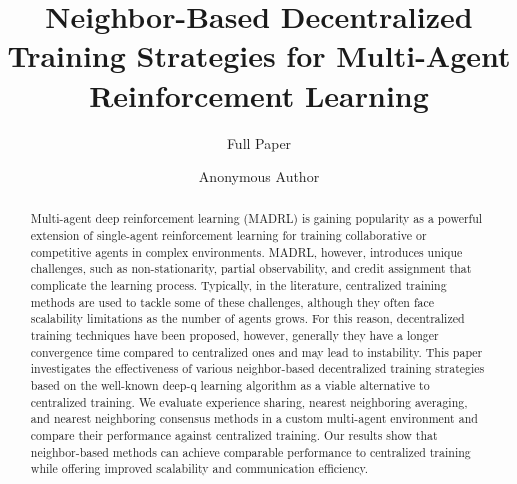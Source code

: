 \documentclass[sigconf]{acmart}
\begin{document}
\title{Neighbor-Based Decentralized Training Strategies for Multi-Agent Reinforcement Learning}
\subtitle{Full Paper}
  
\renewcommand{\shorttitle}{SIG Proceedings Paper in LaTeX Format}





\author{Anonymous Author}
\renewcommand{\shortauthors}{A. Author et al.}

\begin{abstract}
Multi-agent deep reinforcement learning (MADRL) is gaining popularity as a powerful extension of
  single-agent reinforcement learning for training collaborative or competitive agents
  in complex environments. 
%
MADRL, however, introduces unique challenges, such as non-stationarity, partial observability, 
  and credit assignment that complicate the learning process.
%
Typically, in the literature, centralized training methods are used to tackle some of these challenges, 
  although they often face scalability limitations as the number of agents grows.
%
For this reason, decentralized training techniques have been proposed, however, 
  generally they have a longer convergence time compared to centralized ones 
  and may lead to instability.
%
This paper investigates the effectiveness of various neighbor-based decentralized training strategies based on the well-known deep-q learning algorithm 
  as a viable alternative to centralized training. 
%  
We evaluate experience sharing, nearest neighboring averaging, and nearest neighboring consensus methods 
  in a custom multi-agent environment and compare their performance against centralized training. 
%  
Our results show that neighbor-based methods can achieve comparable performance to centralized training 
  while offering improved scalability and communication efficiency. 
%
\end{abstract}
\end{document}
